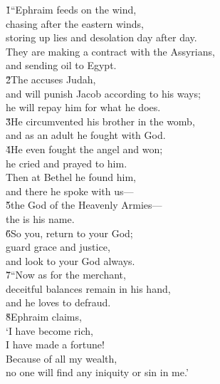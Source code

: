 \begin{poetry}
\poeml {}
\v{1}``Ephraim feeds on the wind, \\
\poemll    chasing after the eastern winds, \\
\poemlll       storing up lies and desolation day after day. \\
\poeml They are making a contract with the Assyrians, \\
\poemll    and sending oil to Egypt. \\
\poeml \v{2}The  accuses Judah, \\
\poemll    and will punish Jacob according to his ways; \\
\poemlll       he will repay him for what he does. \\
\poeml \v{3}He circumvented his brother in the womb, \\
\poemll    and as an adult he fought with God. \\
\poeml \v{4}He even fought the angel and won; \\
\poemll    he cried and prayed to him. \\
\poeml Then at Bethel he found him, \\
\poemll    and there he spoke with us--- \\
\poeml \v{5}the  God of the Heavenly Armies--- \\
\poemll    the  is his name. \\
\poeml \v{6}So you, return to your God; \\
\poemll    guard grace and justice, \\
\poemlll       and look to your God always. \\
\poeml \v{7}``Now as for the merchant, \\
\poemll    deceitful balances remain in his hand, \\
\poemlll       and he loves to defraud. \\
\poeml \v{8}Ephraim claims, \\
\poemll    `I have become rich, \\
\poeml I have made a fortune! \\
\poemll    Because of all my wealth, \\
\poemlll       no one will find any iniquity or sin in me.' \\

\end{poetry}
